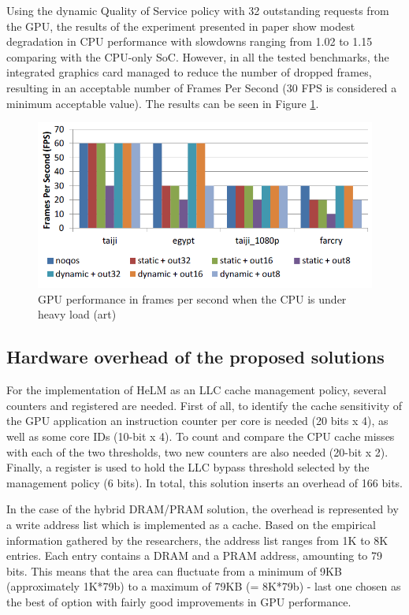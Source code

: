 \documentclass[journal]{IEEEtran}
\begin{document}
Using the dynamic Quality of Service policy with 32 outstanding requests from the GPU, the results of the experiment presented in paper \cite{QoS} show modest degradation in CPU performance with slowdowns ranging from 1.02 to 1.15 comparing with the CPU-only SoC. However, in all the tested benchmarks, the integrated graphics card managed to reduce the number of dropped frames, resulting in an acceptable number of Frames Per Second (30 FPS is considered a minimum acceptable value). The results can be seen in Figure \ref{QoSFPS}.

\begin{figure}[H]
	\centering
	\includegraphics[width = 9 cm]{graphics/QoSfps.PNG}
	\caption{GPU performance in frames per second when the CPU is under heavy load (art)\cite{QoS}}\label{QoSFPS}
\end{figure}

\subsection{Hardware overhead of the proposed solutions}
For the implementation of HeLM as an LLC cache management policy, several counters and registered are needed. First of all, to identify the cache sensitivity of the GPU application an instruction counter per core is needed (20 bits x 4), as well as some core IDs (10-bit x 4). To count and compare the CPU cache misses with each of the two thresholds, two new counters are also needed (20-bit x 2). Finally, a register is used to hold the LLC bypass threshold selected by the management policy (6 bits). In total, this solution inserts an overhead of 166 bits.

In the case of the hybrid DRAM/PRAM solution, the overhead is represented by a write address list which is implemented as a cache. Based on the empirical information gathered by the researchers, the address list ranges from 1K to 8K entries. Each entry contains a DRAM and a PRAM address, amounting to 79 bits. This means that the area can fluctuate from a minimum of 9KB (approximately 1K*79b) to a maximum of 79KB (= 8K*79b) - last one chosen as the best of option with fairly good improvements in GPU performance.
\end{document}
